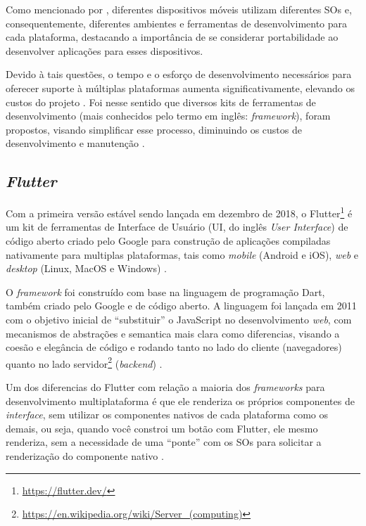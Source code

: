 Como mencionado por , diferentes dispositivos móveis utilizam diferentes SOs e, consequentemente, diferentes
ambientes e ferramentas de desenvolvimento para cada plataforma, destacando a importância de se considerar portabilidade ao desenvolver aplicações para esses dispositivos.

Devido à tais questões, o tempo e o esforço de desenvolvimento necessários para oferecer suporte à múltiplas plataformas aumenta
significativamente, elevando os custos do projeto \cite{Henning2013,Wasserman2010}. Foi nesse sentido que diversos kits de ferramentas de desenvolvimento (mais conhecidos pelo termo em inglês: \emph{framework}), foram propostos, visando simplificar esse processo, diminuindo os
custos de desenvolvimento e manutenção \cite{Martinez2017,Francese2015}.

\subsection{\emph{Flutter}}

Com a primeira versão estável sendo lançada em dezembro de 2018, o Flutter\footnote{\url{https://flutter.dev/}} é um kit de ferramentas de Interface
de Usuário (UI, do inglês \emph{User Interface}) de código aberto criado pelo Google para construção de aplicações compiladas nativamente
para multiplas plataformas, tais como \emph{mobile} (Android e iOS), \emph{web} e \emph{desktop} (Linux, MacOS e Windows) \cite{kuzmin2020experience}.

O \emph{framework} foi construído com base na linguagem de programação Dart, também criado pelo Google e de código aberto.
A linguagem foi lançada em 2011 com o objetivo inicial de ``substituir'' o JavaScript no desenvolvimento \emph{web},
com mecanismos de abstrações e semantica mais clara como diferencias, visando a coesão e elegância de código e
rodando tanto no lado do cliente (navegadores) quanto no lado servidor\footnote{\url{https://en.wikipedia.org/wiki/Server_(computing)}}
(\emph{backend}) \cite{walrath2012dart}.

Um dos diferencias do Flutter com relação a maioria dos \emph{frameworks} para desenvolvimento multiplataforma é que ele renderiza os próprios
componentes de \emph{interface}, sem utilizar os componentes nativos de cada plataforma como os demais, ou seja, quando você constroi um botão com Flutter,
ele mesmo renderiza, sem a necessidade de uma ``ponte'' com os SOs para solicitar a renderização do componente nativo \cite{zammetti2019practical,boukhary2019clean}.

